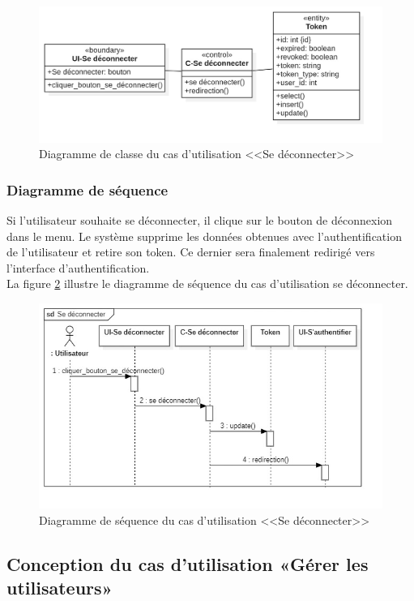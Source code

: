 \begin{figure}[h]
     \centering
      \includegraphics[width=15cm]{images/C-dec.jpg}
     \caption{Diagramme de classe du cas d'utilisation <<Se déconnecter>>}
     \label{fig:cdec}
 \end{figure}
\subsubsection{Diagramme de séquence}
 Si l'utilisateur souhaite se déconnecter, il clique sur le bouton de déconnexion dans le menu. Le système supprime les données obtenues avec l'authentification de l'utilisateur et retire son token. Ce dernier sera finalement redirigé vers l'interface d'authentification.\\
 La figure \ref{fig:sdec} illustre le diagramme de séquence du cas d’utilisation se déconnecter.\\
 \vspace{-0.5cm}
\begin{figure}[h]
     \centering
     \includegraphics[width=15cm]{images/S-dec.jpg}
     \caption{Diagramme de séquence du cas d'utilisation <<Se déconnecter>>}
     \label{fig:sdec}
\end{figure}
\clearpage
\subsection{Conception du cas d'utilisation «Gérer les utilisateurs»}
